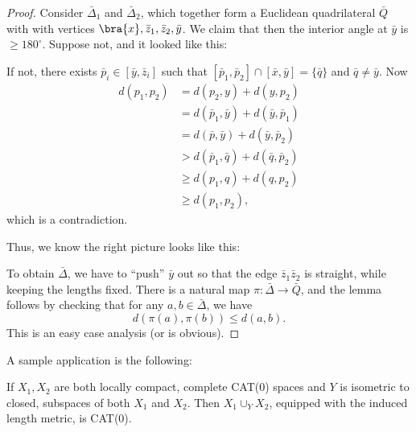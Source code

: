 \documentclass[a4paper]{article}
\begin{document}
\begin{proof}
  Consider $\bar{\Delta}_1$ and $\bar{\Delta}_2$, which together form a Euclidean quadrilateral $\bar{Q}$ with with vertices $\bra{x}, \bar{z}_1, \bar{z}_2, \bar{y}$. We claim that then the interior angle at $\bar{y}$ is $\geq 180^\circ$. Suppose not, and it looked like this:
  \begin{center}
  \end{center}
  If not, there exists $\bar{p}_i \in [\bar{y}, \bar{z}_i]$ such that $[\bar{p}_1, \bar{p}_2] \cap [\bar{x}, \bar{y}] = \{\bar{q}\}$ and $\bar{q} \not= \bar{y}$. Now
  \begin{align*}
    d(p_1, p_2) &= d(p_2, y) + d(y, p_2) \\
    &= d(\bar{p}_1, \bar{y}) + d(\bar{y}, \bar{p}_1)\\
    &= d(\bar{p}, \bar{y}) + d(\bar{y}, \bar{p}_2)\\
    &> d(\bar{p}_1, \bar{q}) + d(\bar{q}, \bar{p}_2)\\
    &\geq d(p_1, q) + d(q, p_2)\\
    &\geq d(p_1, p_2),
  \end{align*}
  which is a contradiction.

  Thus, we know the right picture looks like this:
  \begin{center}
  \end{center}
  To obtain $\bar{\Delta}$, we have to ``push'' $\bar{y}$ out so that the edge $\bar{z}_1 \bar{z}_2$ is straight, while keeping the lengths fixed. There is a natural map $\pi: \bar{\Delta} \to \bar{Q}$, and the lemma follows by checking that for any $a, b \in \bar{\Delta}$, we have
  \[
    d(\pi(a), \pi(b)) \leq d(a, b).
  \]
  This is an easy case analysis (or is obvious).
\end{proof}
 
A sample application is the following:
\begin{prop}
  If $X_1, X_2$ are both locally compact, complete CAT(0) spaces and $Y$ is isometric to closed, subspaces of both $X_1$ and $X_2$. Then $X_1 \cup_Y X_2$, equipped with the induced length metric, is CAT(0).
\end{prop}
\end{document}
